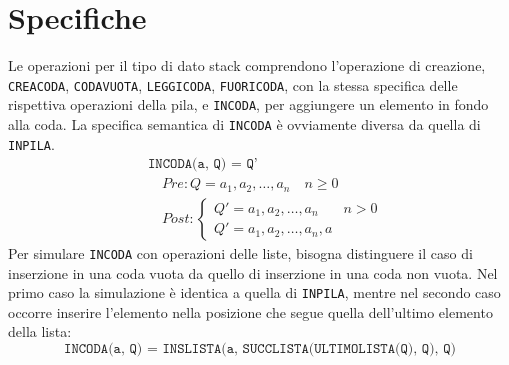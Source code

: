 \documentclass[12pt]{report}
\begin{document}
	\section{Specifiche}
	Le operazioni per il tipo di dato stack comprendono l'operazione di creazione, \texttt{CREACODA}, \texttt{CODAVUOTA}, \texttt{LEGGICODA}, \texttt{FUORICODA}, con la stessa specifica delle rispettiva operazioni della pila, e \texttt{INCODA}, per aggiungere un elemento in fondo alla coda. La specifica semantica di \texttt{INCODA} è ovviamente diversa da quella di \texttt{INPILA}.
	\begin{align*}
		&\texttt{INCODA(a, Q) = Q'} \\
		&\quad Pre: Q = a_1, a_2, \dots, a_n \quad n \geq 0 \\
		&\quad Post: \begin{cases}
			Q' = a_1, a_2, \dots, a_n & n > 0 \\
			Q'= a_1, a_2, \dots, a_n, a
		\end{cases}
	\end{align*}
	Per simulare \texttt{INCODA} con operazioni delle liste, bisogna distinguere il caso di inserzione in una coda vuota da quello di inserzione in una coda non vuota. Nel primo caso la simulazione è identica a quella di \texttt{INPILA}, mentre nel secondo caso occorre inserire l'elemento nella posizione che segue quella dell'ultimo elemento della lista:
	\[
	\texttt{INCODA(a, Q) = INSLISTA(a, SUCCLISTA(ULTIMOLISTA(Q), Q), Q)}
	\]
\end{document}
